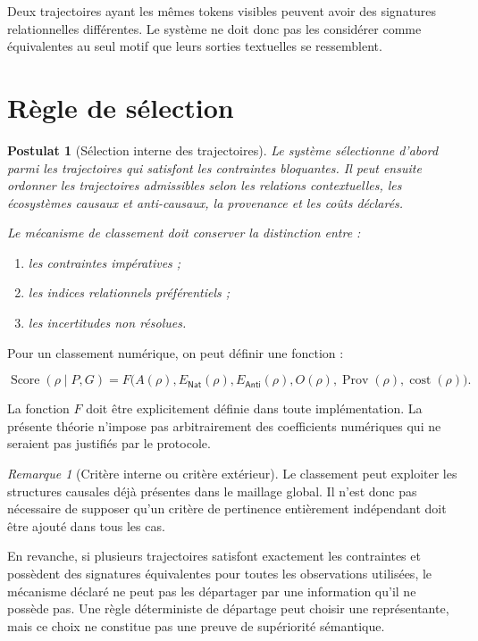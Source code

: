 \documentclass[11pt,a4paper,oneside]{book}
\newtheorem{postulat}[definition]{Postulat}
\theoremstyle{remark}
\newtheorem{remarque}[definition]{Remarque}
\DeclareMathOperator{\cost}{cost}
\DeclareMathOperator{\Score}{Score}
\newcommand{\Nat}{\mathsf{Nat}}
\newcommand{\Anti}{\mathsf{Anti}}
\begin{document}
Deux trajectoires ayant les mêmes tokens visibles peuvent avoir des
signatures relationnelles différentes. Le système ne doit donc pas
les considérer comme équivalentes au seul motif que leurs sorties
textuelles se ressemblent.

\section{Règle de sélection}

\begin{postulat}[Sélection interne des trajectoires]
Le système sélectionne d'abord parmi les trajectoires qui satisfont
les contraintes bloquantes. Il peut ensuite ordonner les trajectoires
admissibles selon les relations contextuelles, les écosystèmes
causaux et anti-causaux, la provenance et les coûts déclarés.

Le mécanisme de classement doit conserver la distinction entre :
\begin{enumerate}
  \item les contraintes impératives ;
  \item les indices relationnels préférentiels ;
  \item les incertitudes non résolues.
\end{enumerate}
\end{postulat}

Pour un classement numérique, on peut définir une fonction :

\[
\Score(\rho\mid P,G)
=
F\bigl(
A(\rho),
E_{\Nat}(\rho),
E_{\Anti}(\rho),
O(\rho),
\operatorname{Prov}(\rho),
\cost(\rho)
\bigr).
\]

La fonction \(F\) doit être explicitement définie dans toute
implémentation. La présente théorie n'impose pas arbitrairement
des coefficients numériques qui ne seraient pas justifiés par le
protocole.

\begin{remarque}[Critère interne ou critère extérieur]
Le classement peut exploiter les structures causales déjà présentes
dans le maillage global. Il n'est donc pas nécessaire de supposer
qu'un critère de pertinence entièrement indépendant doit être ajouté
dans tous les cas.

En revanche, si plusieurs trajectoires satisfont exactement les
contraintes et possèdent des signatures équivalentes pour toutes les
observations utilisées, le mécanisme déclaré ne peut pas les
départager par une information qu'il ne possède pas. Une règle
déterministe de départage peut choisir une représentante, mais ce
choix ne constitue pas une preuve de supériorité sémantique.
\end{remarque}
\end{document}
